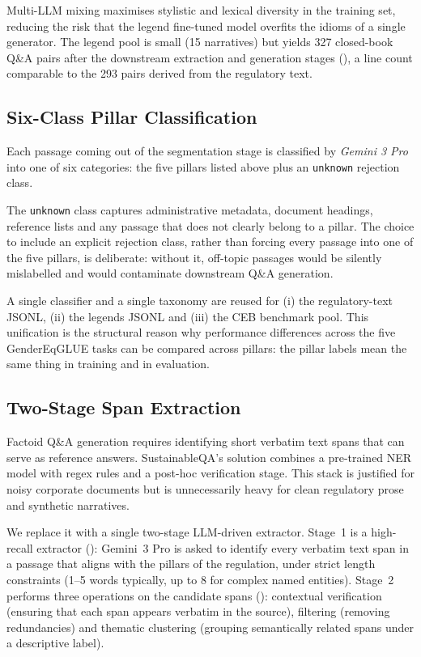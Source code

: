\documentclass[pdflatex, sn-apa]{sn-jnl}%
\theoremstyle{thmstyleone}%
\theoremstyle{thmstyletwo}%
\theoremstyle{thmstylethree}%
\begin{document}
Multi-LLM mixing maximises stylistic and lexical diversity in the training set,
reducing the risk that the legend fine-tuned model overfits the idioms of a
single generator. The legend pool is small (15 narratives) but yields 327
closed-book Q\&A pairs after the downstream extraction and generation stages
(), a line count comparable to the 293 pairs derived from the
regulatory text.

\subsection{Six-Class Pillar Classification}
\label{sec:method:pillar}

Each passage coming out of the segmentation stage is classified by
\textit{Gemini 3 Pro} into one of six categories: the five pillars listed above
plus an \texttt{unknown} rejection class.

The \texttt{unknown} class captures administrative metadata, document headings,
reference lists and any passage that does not clearly belong to a pillar. The
choice to include an explicit rejection class, rather than forcing every passage
into one of the five pillars, is deliberate: without it, off-topic passages would
be silently mislabelled and would contaminate downstream Q\&A generation.

A single classifier and a single taxonomy are reused for (i) the regulatory-text
JSONL, (ii) the legends JSONL and (iii) the CEB benchmark pool. This unification
is the structural reason why performance differences across the five GenderEqGLUE
tasks can be compared across pillars: the pillar labels mean the same thing in
training and in evaluation.

\subsection{Two-Stage Span Extraction}
\label{sec:method:spans}

Factoid Q\&A generation requires identifying short verbatim text spans that can
serve as reference answers. SustainableQA's solution combines a pre-trained NER
model with regex rules and a post-hoc verification stage. This stack is justified
for noisy corporate documents but is unnecessarily heavy for clean regulatory
prose and synthetic narratives.

We replace it with a single two-stage LLM-driven extractor. Stage~1 is a
high-recall extractor (): Gemini~3 Pro is asked to
identify every verbatim text span in a passage that aligns with the pillars of
the regulation, under strict length constraints (1--5 words typically, up to 8 for
complex named entities). Stage~2 performs three operations on the candidate spans
(): contextual verification (ensuring that each span
appears verbatim in the source), filtering (removing redundancies) and thematic
clustering (grouping semantically related spans under a descriptive label).
\end{document}
